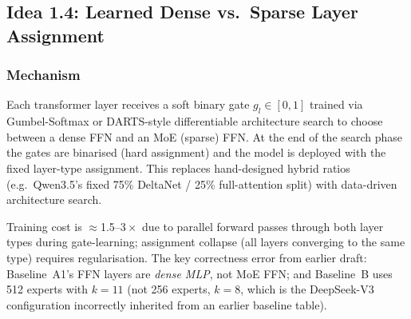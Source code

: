 \documentclass[11pt]{article}
\begin{document}
\subsection{Idea 1.4: Learned Dense vs.\ Sparse Layer Assignment}
\label{subsec:idea-1-4}

\subsubsection*{Mechanism}
Each transformer layer receives a soft binary gate $g_l \in [0,1]$ trained via Gumbel-Softmax or DARTS-style differentiable architecture search to choose between a dense FFN and an MoE (sparse) FFN.
At the end of the search phase the gates are binarised (hard assignment) and the model is deployed with the fixed layer-type assignment.
This replaces hand-designed hybrid ratios (e.g.\ Qwen3.5's fixed 75\% DeltaNet / 25\% full-attention split) with data-driven architecture search.

Training cost is $\approx$1.5--$3\times$ due to parallel forward passes through both layer types during gate-learning; assignment collapse (all layers converging to the same type) requires regularisation.
The key correctness error from earlier draft: Baseline~A1's FFN layers are \emph{dense MLP}, not MoE FFN; and Baseline~B uses 512 experts with $k=11$ (not 256 experts, $k=8$, which is the DeepSeek-V3 configuration incorrectly inherited from an earlier baseline table).
\end{document}
